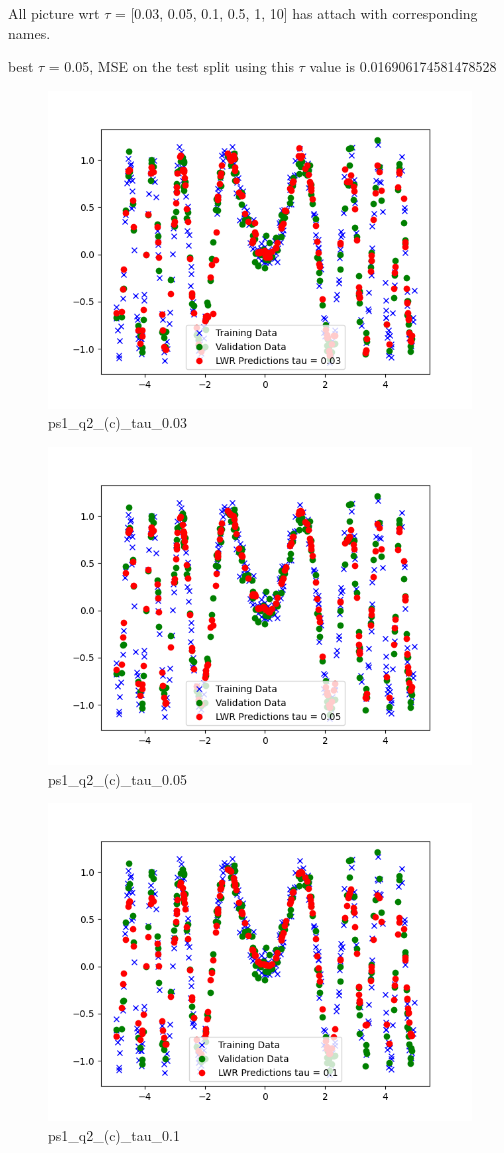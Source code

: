 \begin{answer}


All picture wrt $\tau$ = [0.03, 0.05, 0.1, 0.5, 1, 10] has attach with corresponding names.


best $\tau$ = 0.05, MSE on the test split using this $\tau$ value is 0.016906174581478528

\begin{figure}[H]
    \centering
    \includegraphics[width=0.5\linewidth]{ps1_q2_(c)_tau_0.03.png}
    \caption{ps1\_q2\_(c)\_tau\_0.03}
    \label{fig:enter-label}
\end{figure}

\begin{figure}[H]
    \centering
    \includegraphics[width=0.5\linewidth]{ps1_q2_(c)_tau_0.05.png}
    \caption{ps1\_q2\_(c)\_tau\_0.05}
    \label{fig:enter-label}
\end{figure}

\begin{figure}[H]
    \centering
    \includegraphics[width=0.5\linewidth]{ps1_q2_(c)_tau_0.1.png}
    \caption{ps1\_q2\_(c)\_tau\_0.1}
    \label{fig:enter-label}
\end{figure}


\end{answer}
